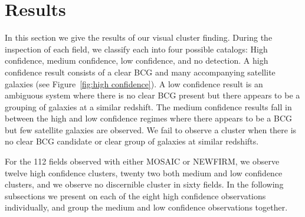 \documentclass[apj, revtex4]{emulateapj}
\begin{document}
\section{Results}\label{sec:results}

In this section we give the results of our visual cluster finding. During the inspection of each field, we classify each into four possible catalogs: High confidence, medium confidence, low confidence, and no detection. A high confidence result consists of a clear BCG and many accompanying satellite galaxies (see Figure~\ref{fig:high confidence}). A low confidence result is an ambiguous system where there is no clear BCG present but there appears to be a grouping of galaxies at a similar redshift. The medium confidence results fall in between the high and low confidence regimes where there appears to be a BCG but few satellite galaxies are observed. We fail to observe a cluster when there is no clear BCG candidate or clear group of galaxies at similar redshifts.

For the 112 fields observed with either MOSAIC or NEWFIRM, we observe twelve high confidence clusters, twenty two both medium and low confidence clusters, and we observe no discernible cluster in sixty fields. In the following subsections we present on each of the eight high confidence observations individually, and group the medium and low confidence observations together.
\end{document}
